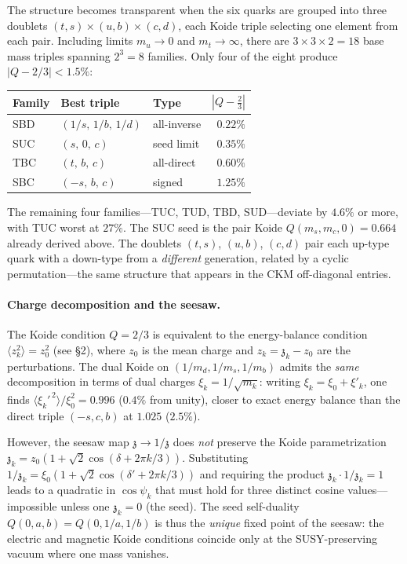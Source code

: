 \documentclass[12pt,a4paper]{article}
\newcommand{\zch}{\mathfrak{z}}
\begin{document}
The structure becomes transparent when the six quarks are
grouped into three doublets
$(t,s)\times(u,b)\times(c,d)$,
each Koide triple selecting one element from each pair.
Including limits $m_u\!\to\! 0$ and $m_t\!\to\!\infty$,
there are $3\times 3\times 2 = 18$ base mass triples spanning
$2^3 = 8$ families.  Only four of the eight produce
$|Q - 2/3| < 1.5\%$:
%
\begin{center}
\small
\begin{tabular}{lllr}
\textbf{Family} & \textbf{Best triple} & \textbf{Type} & $|Q-\tfrac{2}{3}|$ \\
\hline
SBD & $(1/s,\,1/b,\,1/d)$     & all-inverse  & $0.22\%$ \\
SUC & $(s,\,0,\,c)$            & seed limit   & $0.35\%$ \\
TBC & $(t,\,b,\,c)$            & all-direct   & $0.60\%$ \\
SBC & $(-s,\,b,\,c)$           & signed       & $1.25\%$ \\
\end{tabular}
\end{center}
%
The remaining four families---TUC, TUD, TBD, SUD---deviate
by $4.6\%$ or more, with TUC worst at $27\%$.
The SUC seed is the pair Koide $Q(m_s,m_c,0) = 0.664$ already
derived above.
The doublets $(t,s)$, $(u,b)$, $(c,d)$ pair each
up-type quark with a down-type from a \emph{different} generation,
related by a cyclic permutation---the same
structure that appears in the CKM off-diagonal entries.

\paragraph{Charge decomposition and the seesaw.}
The Koide condition $Q=2/3$ is equivalent to the energy-balance
condition $\langle z_k^2\rangle = z_0^2$ (see \S2),
where $z_0$ is the mean charge and $z_k = \zch_k - z_0$ are the
perturbations.
The dual Koide on $(1/m_d,1/m_s,1/m_b)$ admits the
\emph{same} decomposition in terms of dual charges
$\xi_k = 1/\sqrt{m_k}$: writing $\xi_k = \xi_0 + \xi'_k$,
one finds $\langle\xi_k'^{\,2}\rangle/\xi_0^2 = 0.996$
($0.4\%$ from unity), closer to exact energy balance than
the direct triple $(-s,c,b)$ at $1.025$ ($2.5\%$).

However, the seesaw map $\zch \to 1/\zch$ does \emph{not}
preserve the Koide parametrization
$\zch_k = z_0(1+\sqrt{2}\cos(\delta+2\pi k/3))$.
Substituting $1/\zch_k = \xi_0(1+\sqrt{2}\cos(\delta'+2\pi k/3))$
and requiring the product $\zch_k \cdot 1/\zch_k = 1$
leads to a quadratic in $\cos\psi_k$ that must hold for
three distinct cosine values---impossible unless
one $\zch_k = 0$ (the seed).
The seed self-duality $Q(0,a,b) = Q(0,1/a,1/b)$ is
thus the \emph{unique} fixed point of the seesaw:
the electric and magnetic Koide conditions coincide
only at the SUSY-preserving vacuum where one mass vanishes.
\end{document}
